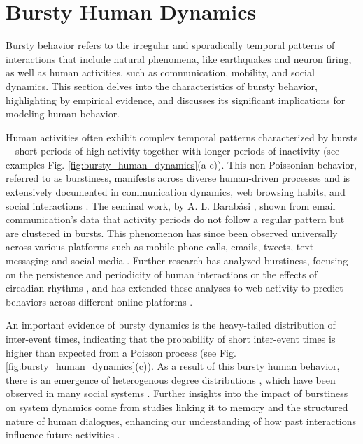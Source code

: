 \section{\label{sec: Bursty Human Dynamics} Bursty Human Dynamics}

Bursty behavior refers to the irregular and sporadically temporal patterns of interactions that include natural phenomena, like earthquakes and neuron firing, as well as human activities, such as communication, mobility, and social dynamics. This section delves into the characteristics of bursty behavior, highlighting by empirical evidence, and discusses its significant implications for modeling human behavior.

Human activities often exhibit complex temporal patterns characterized by bursts---short periods of high activity together with longer periods of inactivity (see examples Fig. \ref{fig:bursty_human_dynamics}(a-c)). This non-Poissonian behavior, referred to as burstiness, manifests across diverse human-driven processes and is extensively documented in communication dynamics, web browsing habits, and social interactions \cite{Barabasi2005Bursts, Vazquez2006Bursts}. The seminal work, by A. L. Barabási \cite{Barabasi2005Bursts}, shown from email communication's data that activity periods do not follow a regular pattern but are clustered in bursts. This phenomenon has since been observed universally across various platforms such as mobile phone calls, emails, tweets, text messaging and social media \cite{karsai-2011, Miritello2013Capacity,moro,artime-2017,rybski-2012,zignani-2016,kumar-2020,iribarren-2009}. Further research has analyzed burstiness, focusing on the persistence and periodicity of human interactions \cite{Clauset2007Proximity} or the effects of circadian rhythms \cite{Jo2012Circadian}, and has extended these analyses to web activity to predict behaviors across different online platforms \cite{Radicchi2009WebActivity}.

An important evidence of bursty dynamics is the heavy-tailed distribution of inter-event times, indicating that the probability of short inter-event times is higher than expected from a Poisson process (see Fig. \ref{fig:bursty_human_dynamics}(c)). As a result of this bursty human behavior, there is an emergence of heterogenous degree distributions \cite{Muchnik2013PowerLaw}, which have been observed in many social systems \cite{barabasi2009scale}. Further insights into the impact of burstiness on system dynamics come from studies linking it to memory and the structured nature of human dialogues, enhancing our understanding of how past interactions influence future activities \cite{karsai2012universal, Goh2008Burstiness, Eckmann2004Entropy}.

